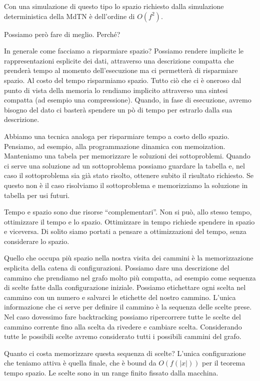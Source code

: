 Con una simulazione di questo tipo lo spazio richiesto dalla simulazione deterministica della MdTN
è dell'ordine di $O(f^{2})$.

Possiamo però fare di meglio. Perché?

In generale come facciamo a risparmiare spazio? Possiamo rendere implicite le rappresentazioni
esplicite dei dati, attraverso una descrizione compatta che prenderà tempo al momento
dell'esecuzione ma ci permetterà di risparmiare spazio. Al costo del tempo risparmiamo spazio.
Tutto ciò che ci è oneroso dal punto di vista della memoria lo rendiamo implicito attraverso una
sintesi compatta (ad esempio una compressione). Quando, in fase di esecuzione, avremo bisogno del
dato ci basterà spendere un pò di tempo per estrarlo dalla sua descrizione.

Abbiamo una tecnica analoga per risparmiare tempo a costo dello spazio. Pensiamo, ad esempio, alla
programmazione dinamica con memoization. Manteniamo una tabela per memorizzare le soluzioni dei
sottoproblemi. Quando ci serve una soluzione ad un sottoproblema possiamo guardare la tabella e, nel
caso il sottoproblema sia già stato risolto, ottenere subito il risultato richiesto. Se questo non
è il caso risolviamo il sottoproblema e memorizziamo la soluzione in tabella per usi futuri.

Tempo e spazio sono due risorse ``complementari''. Non si può, allo stesso tempo, ottimizzare il
tempo e lo spazio. Ottimizzare in tempo richiede spendere in spazio e viceversa.  Di solito siamo
portati a pensare a ottimizzazioni del tempo, senza considerare lo spazio.

Quello che occupa più spazio nella nostra visita dei cammini è la memorizzazione esplicita della
catena di configurazioni. Possiamo dare una descrizione del cammino che prendiamo nel grafo molto
più compatta, ad esempio come sequenza di scelte fatte dalla configurazione iniziale. Possiamo
etichettare ogni scelta nel cammino con un numero e salvarci le etichette del nostro cammino.
L'unica informazione che ci serve per definire il cammino è la sequenza delle scelte prese. Nel
caso dovessimo fare backtracking possiamo ripercorrere tutte le scelte del cammino corrente fino
alla scelta da rivedere e cambiare scelta. Considerando tutte le possibili scelte avremo considerato
tutti i possibili cammini del grafo.

Quanto ci costa memorizzare questa sequenza di scelte? L'unica configurazione che teniamo attiva è
quella finale, che è bound da $O(f(|x|))$ per il teorema tempo spazio. Le scelte sono in un range
finito fissato dalla macchina.

